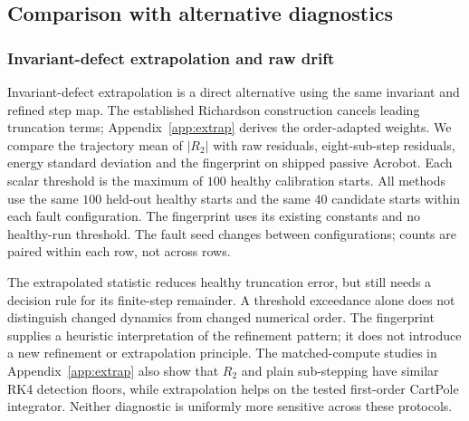 \documentclass[10pt]{article}
\theoremstyle{definition}
\newcommand{\fittable}[2][\linewidth]{%
  \sbox{\tablebox}{#2}%
  \ifdim\wd\tablebox>#1\relax
    \resizebox{#1}{!}{\usebox{\tablebox}}%
  \else
    \usebox{\tablebox}%
  \fi}
\begin{document}
\subsection{Comparison with alternative diagnostics}\label{sec:position}

\subsubsection{Invariant-defect extrapolation and raw drift}\label{sec:extrap-main}

Invariant-defect extrapolation is a direct alternative using the same
invariant and refined step map. The established Richardson construction
\citep{richardson1927} cancels leading truncation terms; Appendix~\ref{app:extrap}
derives the order-adapted weights. We compare the trajectory mean of
$|R_2|$ with raw residuals, eight-sub-step residuals, energy standard
deviation and the fingerprint on shipped passive Acrobot. Each scalar
threshold is the maximum of $100$ healthy calibration starts. All methods
use the same $100$ held-out healthy starts and the same $40$ candidate
starts within each fault configuration. The fingerprint uses its existing
constants and no healthy-run threshold. The fault seed changes between
configurations; counts are paired within each row, not across rows.

\begin{table}[htbp]
\centering\small
\fittable{}
\caption{Existing calibrated-detector experiment at $h=0.2$, $10$~s,
with matched evaluation starts. Entries are counts. Scalar columns flag a
threshold exceedance; the final column counts \emph{model} labels, not all
fault flags. Thus zero in the final column for Euler or midpoint is not a
missed integrator fault: their full labels are order-1 and order-2/order-3.
The diagnostics require respectively $1$, $1$, $8$, $7$ and $15$ simulator
steps per sampled state, counting shared branches once; the trajectory
itself is shared. The $100$ calibration runs are additional baseline cost.}
\label{tab:extrap-main}
\end{table}

The extrapolated statistic reduces healthy truncation error, but still needs
a decision rule for its finite-step remainder. A threshold exceedance alone
does not distinguish changed dynamics from changed numerical order. The
fingerprint supplies a heuristic interpretation of the refinement pattern;
it does not introduce a new refinement or extrapolation principle. The
matched-compute studies in Appendix~\ref{app:extrap} also show that $R_2$
and plain sub-stepping have similar RK4 detection floors, while extrapolation
helps on the tested first-order CartPole integrator. Neither diagnostic is
uniformly more sensitive across these protocols.
\end{document}
